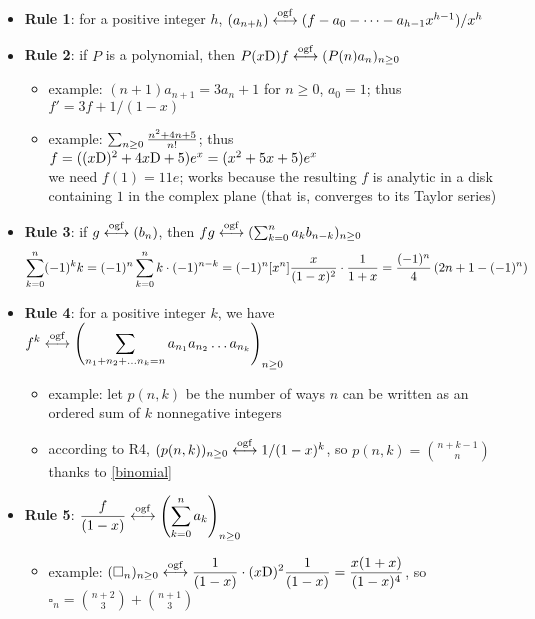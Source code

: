 \documentclass[10pt, a4paper]{article}
\def\ogf{\overset{{\rm ogf}}{\longleftrightarrow}}
\def\xD{x{\rm D}}
\begin{document}
\begin{itemize}
    \item {\bf Rule 1}: for a positive integer $h$, $(a_{n+h})\ogf (f-a_0-\dots-a_{h-1}x^{h-1})/x^h$
    \item {\bf Rule 2}: if $P$ is a polynomial, then $P(\xD)f\ogf (P(n)a_n)_{n\ge 0}$
        \begin{itemize}
            \item example: $(n+1)a_{n+1} = 3a_n+1$ for $n\ge 0$, $a_0 = 1$; thus $f' = 3f + 1/(1-x)$
            \item example: $\sum_{n\ge 0} {n^2+4n+5\over n!}$; thus $f=((\xD)^2+4\xD+5)e^x = (x^2+5x+5)e^x$\\
                \hspace*{.5 cm} we need $f(1)=11e$; works because the resulting $f$ is analytic in a disk\\
                \hspace*{.5 cm} containing $1$ in the complex plane (that is, converges to its Taylor series)
        \end{itemize}
    \item {\bf Rule 3}: if $g\ogf (b_n)$, then $fg\ogf (\sum_{k=0}^n a_kb_{n-k})_{n\ge 0}$
        $$ \sum_{k=0}^n (-1)^kk = (-1)^n\sum_{k=0}^n k\cdot (-1)^{n-k} = (-1)^n[x^n]{x\over (1-x)^2}\cdot{1\over 1+x} = {(-1)^n\over 4}\left(2n+1-(-1)^n\right)$$
    \item {\bf Rule 4}: for a positive integer $k$, we have $\displaystyle f^k\ogf \left(\sum_{n_1+n_2+\dots n_k=n} a_{n_1}a_{n_2}\dots a_{n_k}\right)_{n\ge 0}$
        \begin{itemize}
            \item example: let $p(n,k)$ be the number of ways $n$ can be written as an ordered sum of $k$ nonnegative integers
            \item according to R4, $(p(n,k))_{n\ge 0}\ogf 1/(1-x)^k$, so $p(n,k) = {n+k-1\choose n}$ thanks to \eqref{binomial}
        \end{itemize}
    \item {\bf Rule 5}: $\displaystyle {f\over (1-x)}\ogf \left(\sum_{k=0}^n a_k\right)_{n\ge 0}$\\
        \begin{itemize}
            \item example: $\displaystyle (\square_n)_{n\ge 0}\ogf {1\over (1-x)}\cdot (\xD)^2 {1\over (1-x)} = {x(1+x)\over (1-x)^4}$, so $\square_n = {n+2\choose 3}+{n+1\choose 3}$
        \end{itemize}
\end{itemize}
\end{document}
